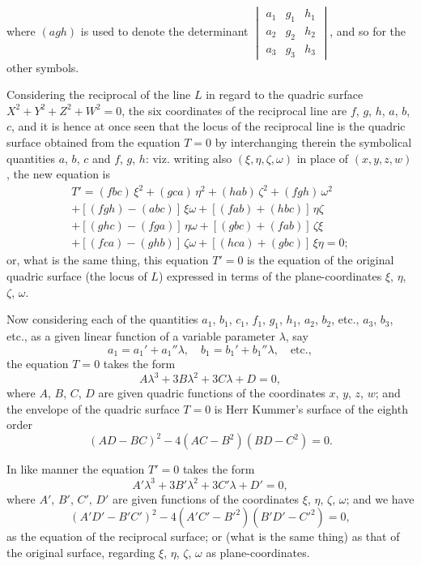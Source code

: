 \documentclass[11pt,a4paper]{book}
\begin{document}
where $(agh)$ is used to denote the determinant $\begin{vmatrix} a_1 & g_1 & h_1 \\ a_2 & g_2 & h_2 \\ a_3 & g_3 & h_3 \end{vmatrix}$, and so for the other symbols.

Considering the reciprocal of the line $L$ in regard to the quadric surface $X^2 + Y^2 + Z^2 + W^2 = 0$, the six coordinates of the reciprocal line are $f$, $g$, $h$, $a$, $b$, $c$, and it is hence at once seen that the locus of the reciprocal line is the quadric surface obtained from the equation $T=0$ by interchanging therein the symbolical quantities $a$, $b$, $c$ and $f$, $g$, $h$: viz. writing also $(\xi, \eta, \zeta, \omega)$ in place of $(x, y, z, w)$, the new equation is
\begin{multline*}
T' = (fbc)\, \xi^2 + (gca)\, \eta^2 + (hab)\, \zeta^2 + (fgh)\, \omega^2 \\
+ [(fgh) - (abc)]\, \xi\omega + [(fab) + (hbc)]\, \eta\zeta \\
+ [(ghc) - (fga)]\, \eta\omega + [(gbc) + (fab)]\, \zeta\xi \\
+ [(fca) - (ghb)]\, \zeta\omega + [(hca) + (gbc)]\, \xi\eta = 0;
\end{multline*}
or, what is the same thing, this equation $T' = 0$ is the equation of the original quadric surface (the locus of $L$) expressed in terms of the plane-coordinates $\xi$, $\eta$, $\zeta$, $\omega$.

Now considering each of the quantities $a_1$, $b_1$, $c_1$, $f_1$, $g_1$, $h_1$, $a_2$, $b_2$, etc., $a_3$, $b_3$, etc., as a given linear function of a variable parameter $\lambda$, say
\[
a_1 = a_1' + a_1''\lambda, \quad b_1 = b_1' + b_1''\lambda, \quad \text{etc.},
\]
the equation $T=0$ takes the form
\[
A\lambda^3 + 3B\lambda^2 + 3C\lambda + D = 0,
\]
where $A$, $B$, $C$, $D$ are given quadric functions of the coordinates $x$, $y$, $z$, $w$; and the envelope of the quadric surface $T=0$ is Herr Kummer's surface of the eighth order
\[
(AD - BC)^2 - 4(AC - B^2)(BD - C^2) = 0.
\]

In like manner the equation $T' = 0$ takes the form
\[
A'\lambda^3 + 3B'\lambda^2 + 3C'\lambda + D' = 0,
\]
where $A'$, $B'$, $C'$, $D'$ are given functions of the coordinates $\xi$, $\eta$, $\zeta$, $\omega$; and we have
\[
(A'D' - B'C')^2 - 4(A'C' - B'^2)(B'D' - C'^2) = 0,
\]
as the equation of the reciprocal surface; or (what is the same thing) as that of the original surface, regarding $\xi$, $\eta$, $\zeta$, $\omega$ as plane-coordinates.
\end{document}
